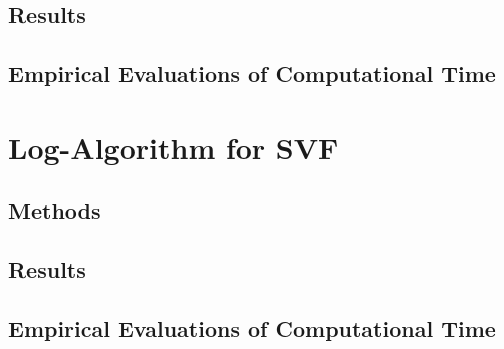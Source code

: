 \subsection{Results}

\subsection{Empirical Evaluations of Computational Time}

\section{Log-Algorithm for SVF}

\subsection{Methods}

\subsection{Results}


\subsection{Empirical Evaluations of Computational Time}


